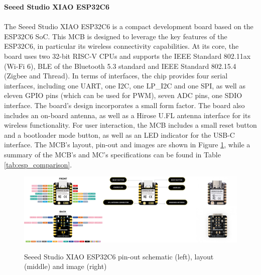 \textbf{Seeed Studio XIAO ESP32C6}\\\\
The Seeed Studio XIAO ESP32C6 is a compact development board based on the ESP32C6 SoC. This MCB is designed to leverage the key features of the ESP32C6, in particular its wireless connectivity capabilities. At its core, the board uses two 32-bit RISC-V CPUs and supports the IEEE Standard 802.11ax (Wi-Fi 6), BLE of the Bluetooth 5.3 standard and IEEE Standard 802.15.4 (Zigbee and Thread).
In terms of interfaces, the chip provides four serial interfaces, including one UART, one I2C, one LP\_I2C and one SPI, as well as eleven GPIO pins (which can be used for PWM), seven ADC pins, one SDIO interface. The board's design incorporates a small form factor. 
The board also includes an on-board antenna, as well as a Hirose U.FL antenna interface for its wireless functionality. For user interaction, the MCB includes a small reset button and a bootloader mode button, as well as an LED indicator for the USB-C interface. The MCB's layout, pin-out and images are shown in Figure \ref{fig:esp32c6}, while a summary of the MCB's and MC's specifications can be found in Table \ref{tab:esp_comparison}.  \citep{espressif_systems_esp32-c6_2024, seeed_studio_seeed_2024-1}
\begin{figure}[H]
    \centering
    \includegraphics[width=\textwidth]{overleaf/images/xiaoesp32c6.png}
    \\\vspace{\ftspace}
    \caption{Seeed Studio XIAO ESP32C6 pin-out schematic (left), layout (middle) and image (right) \citep[adapted from][]{seeed_studio_seeed_2024-1}}
    \label{fig:esp32c6}
\end{figure}

